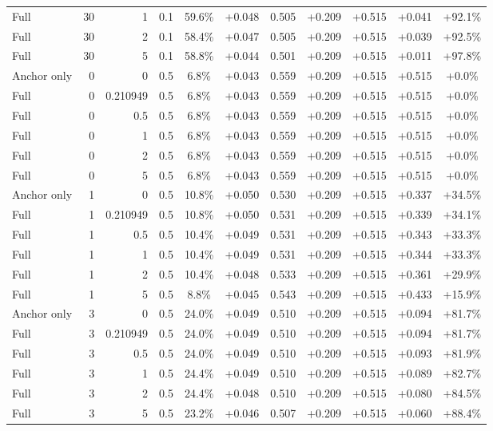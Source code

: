 \begin{table}[htbp]
\begin{tabular}{lrrrccccccc}
Full & 30 & 1 & 0.1 & 59.6\% & +0.048 & 0.505 & +0.209 & +0.515 & +0.041 & +92.1\% \\
Full & 30 & 2 & 0.1 & 58.4\% & +0.047 & 0.505 & +0.209 & +0.515 & +0.039 & +92.5\% \\
Full & 30 & 5 & 0.1 & 58.8\% & +0.044 & 0.501 & +0.209 & +0.515 & +0.011 & +97.8\% \\
Anchor only & 0 & 0 & 0.5 & 6.8\% & +0.043 & 0.559 & +0.209 & +0.515 & +0.515 & +0.0\% \\
Full & 0 & 0.210949 & 0.5 & 6.8\% & +0.043 & 0.559 & +0.209 & +0.515 & +0.515 & +0.0\% \\
Full & 0 & 0.5 & 0.5 & 6.8\% & +0.043 & 0.559 & +0.209 & +0.515 & +0.515 & +0.0\% \\
Full & 0 & 1 & 0.5 & 6.8\% & +0.043 & 0.559 & +0.209 & +0.515 & +0.515 & +0.0\% \\
Full & 0 & 2 & 0.5 & 6.8\% & +0.043 & 0.559 & +0.209 & +0.515 & +0.515 & +0.0\% \\
Full & 0 & 5 & 0.5 & 6.8\% & +0.043 & 0.559 & +0.209 & +0.515 & +0.515 & +0.0\% \\
Anchor only & 1 & 0 & 0.5 & 10.8\% & +0.050 & 0.530 & +0.209 & +0.515 & +0.337 & +34.5\% \\
Full & 1 & 0.210949 & 0.5 & 10.8\% & +0.050 & 0.531 & +0.209 & +0.515 & +0.339 & +34.1\% \\
Full & 1 & 0.5 & 0.5 & 10.4\% & +0.049 & 0.531 & +0.209 & +0.515 & +0.343 & +33.3\% \\
Full & 1 & 1 & 0.5 & 10.4\% & +0.049 & 0.531 & +0.209 & +0.515 & +0.344 & +33.3\% \\
Full & 1 & 2 & 0.5 & 10.4\% & +0.048 & 0.533 & +0.209 & +0.515 & +0.361 & +29.9\% \\
Full & 1 & 5 & 0.5 & 8.8\% & +0.045 & 0.543 & +0.209 & +0.515 & +0.433 & +15.9\% \\
Anchor only & 3 & 0 & 0.5 & 24.0\% & +0.049 & 0.510 & +0.209 & +0.515 & +0.094 & +81.7\% \\
Full & 3 & 0.210949 & 0.5 & 24.0\% & +0.049 & 0.510 & +0.209 & +0.515 & +0.094 & +81.7\% \\
Full & 3 & 0.5 & 0.5 & 24.0\% & +0.049 & 0.510 & +0.209 & +0.515 & +0.093 & +81.9\% \\
Full & 3 & 1 & 0.5 & 24.4\% & +0.049 & 0.510 & +0.209 & +0.515 & +0.089 & +82.7\% \\
Full & 3 & 2 & 0.5 & 24.4\% & +0.048 & 0.510 & +0.209 & +0.515 & +0.080 & +84.5\% \\
Full & 3 & 5 & 0.5 & 23.2\% & +0.046 & 0.507 & +0.209 & +0.515 & +0.060 & +88.4\% \\

\end{tabular}
\end{table}
